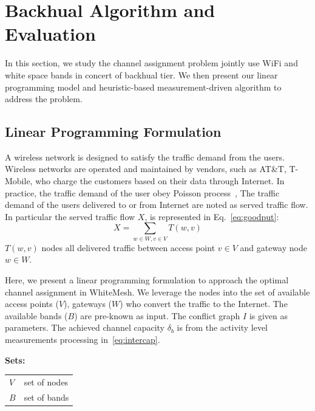\section{Backhual Algorithm and Evaluation}
\label{sec:whitemesh}

In this section, we study the channel assignment problem jointly use  WiFi and white space 
bands in concert of backhual tier. We then present our linear programming model and 
heuristic-based measurement-driven algorithm to address the problem. 
 
\subsection{Linear Programming Formulation}
\label{subsec:linearopt}


A wireless network is designed to satisfy the traffic demand from the users. Wireless networks are 
operated and maintained by vendors, such as AT\&T, T-Mobile, who charge the customers based on their 
data through Internet. In practice, the traffic demand of the user obey Poisson process~\cite{saaty1961elements}, 
The traffic demand of the users delivered to or from Internet are noted as served traffic flow. 
In particular the served traffic flow $X$, is represented in Eq.~\ref{eq:goodput}:
\begin{equation}
\label{eq:goodput}
X=\sum_{w \in W, v \in V}T(w,v)
\end{equation}
$T(w,v)$ nodes all delivered traffic between access point $v \in V$ and gateway node $w \in W$.


Here, we present a linear programming formulation to approach the optimal channel assignment in WhiteMesh. 
We leverage the nodes into the set of available access points ($V$), gateways ($W$) who convert the traffic to the 
Internet. The available bands ($B$) are pre-known as input. The conflict graph $I$ is given 
as parameters. The achieved channel capacity $\delta_b$ is from the  activity level measurements processing in~\ref{eq:intercap}. 


\noindent
{\bf Sets:}
\begin{tabular}{ll}
$V$ & set of nodes \\
$B$ & set of bands \\
\end{tabular}

